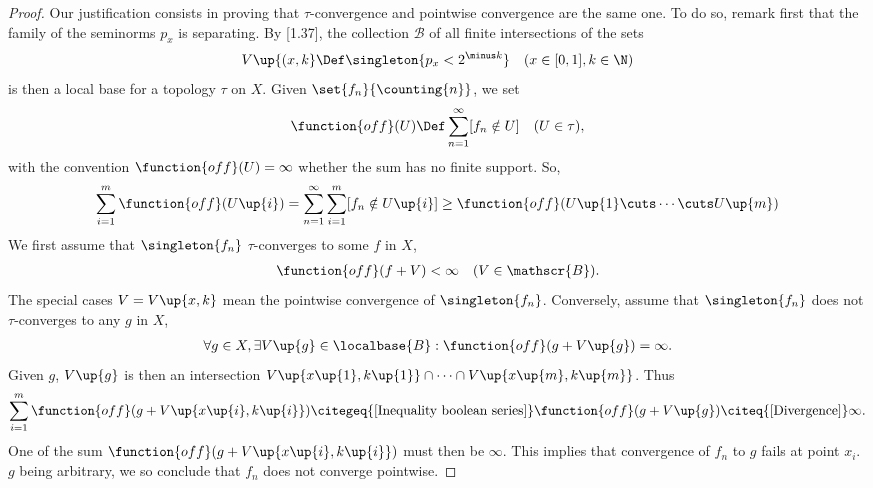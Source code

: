 \begin{proof}
Our justification consists in proving that $\tau$-convergence and pointwise 
convergence are the same one. 
%
To do so, remark first that the family of the seminorms $p_{x}$ is separating.
By [1.37], the collection $\mathscr{B}$ of all finite intersections 
of the sets 
%
  \begin{align}
    V\up{(x, k} 
      \Def 
    \singleton{p_x < 2^{\minus k}} 
      \quad 
    (x \in [0, 1], k \in \N)
  \end{align}
%
is then a local base for a topology $\tau$ on $X$. Given 
%
  $\set{f_n}{\counting{n}}$, 
%
we set
%
\newcommand\off[1]{\function{off}(#1)}
%
\begin{align}
  \off{U} \Def \sum_{n=1}^\infty [f_n \notin U] \quad (U\in\tau),
\end{align}
%
with the convention $\off{U}=\infty$ whether the sum has no finite support. 
So, 
%
  \begin{align}
    \label{Inequality boolean series}
    \sum_{i=1}^m \off{U\up{i}} 
      = 
    \sum_{n=1}^\infty \sum_{i=1}^m [f_n \notin U\up{i}]
      \geq 
    \off{U\up{1} \cuts \cdots \cuts U\up{m}}
  \end{align}
%
We first assume that $\singleton{f_n}$ $\tau$-converges to some $f$ in $X$, \ie
%
  \begin{align}
    \off{f+V} < \infty \quad(V \in \mathscr{B}).
  \end{align}
%
The special cases $V=V\up{x, k}$ mean the pointwise convergence of 
$\singleton{f_n}$. 
%
Conversely, assume that $\singleton{f_n}$ does not $\tau$-converges to any $g$ 
in $X$, \ie 
%
  \begin{align}
    \label{Divergence}
    \forall g \in X, \exists V\up{g} \in \localbase{B}: 
      \off{g+V\up{g}} = \infty. 
  \end{align}
%
Given $g$, $V\up{g}$ is then an intersection
%
  $
    V\up{x\up{1}, k\up{1}} \cap \cdots \cap 
    V\up{x\up{m}, k\up{m}} 
  $.
%
Thus
%
  \begin{align}
    \sum_{i=1}^m \off{g + V\up{x\up{i}, k\up{i}}} 
        \citegeq{\ref{Inequality boolean series}} 
    \off{g + V\up{g}} 
      \citeq{\ref{Divergence}} 
    \infty .
  \end{align}
%
One of the sum $\off{g + V\up{x\up{i}, k\up{i}}}$ must then be $\infty$. 
This implies that convergence of $f_n$ to $g$ fails at point $x_i$.
$g$ being arbitrary, we so conclude that $f_n$ does not converge pointwise.

\end{proof}
